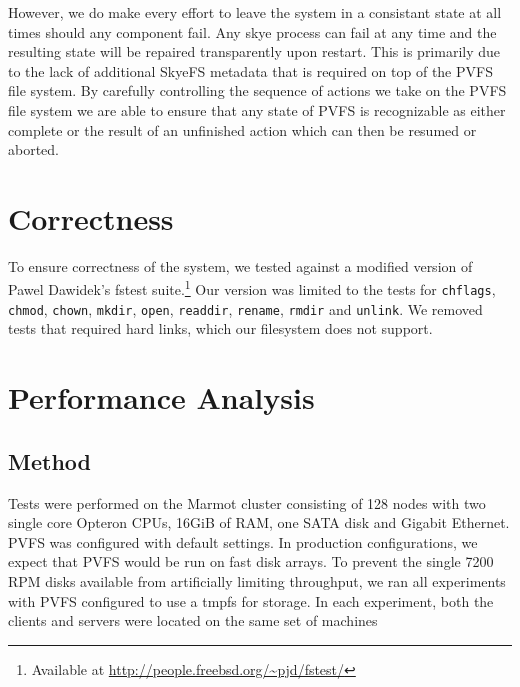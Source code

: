 \documentclass[twocolumn,letterpaper]{article}
\newcommand{\code}[1]{\texttt{#1}}
\begin{document}
However, we do make every effort to leave the system in a consistant state at
all times should any component fail.  Any skye process can fail at any time
and the resulting state will be repaired transparently upon restart.  This is
primarily due to the lack of additional SkyeFS metadata that is required on
top of the PVFS file system.  By carefully controlling the sequence of actions
we take on the PVFS file system we are able to ensure that any state of PVFS
is recognizable as either complete or the result of an unfinished action which
can then be resumed or aborted.

\section{Correctness}
To ensure correctness of the system, we tested against a modified version of
Pawel Dawidek's fstest suite.\footnote{Available at
\url{http://people.freebsd.org/~pjd/fstest/}}  Our version was limited to the
tests for \code{chflags}, \code{chmod}, \code{chown}, \code{mkdir},
\code{open}, \code{readdir}, \code{rename}, \code{rmdir} and \code{unlink}.
We removed tests that required hard links, which our filesystem does not
support.

\section{Performance Analysis}

\subsection{Method}
Tests were performed on the Marmot cluster consisting of 128 nodes with two
single core Opteron CPUs, 16GiB of RAM, one SATA disk and Gigabit Ethernet.
PVFS was configured with default settings.  In production configurations, we
expect that PVFS would be run on fast disk arrays.  To prevent the single 7200
RPM disks available from artificially limiting throughput, we ran all
experiments with PVFS configured to use a tmpfs for storage.  In each
experiment, both the clients and servers were located on the same set of
machines
\end{document}
